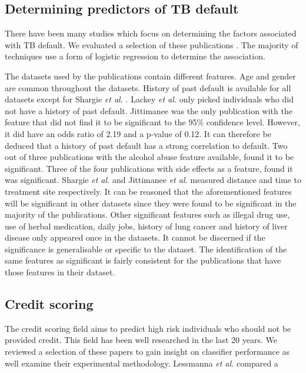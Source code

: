 \documentclass{sig-alternate-05-2015}
\begin{document}
	\subsection{Determining predictors of TB default}
	\label{predictors_of_defaulters_related_work}
	There have been many studies which focus on determining the factors associated with TB default. We evaluated a selection of these publications \cite{chan:2003prevalence, Jha:10.1371/journal.pone.0008873, jittimanee:10.1111/j.1440-172X.2007.00650.x, Lackey:10356751520150601, muture:6660173120110101, Shargie:10.1371/journal.pmed.0040037}. The majority of techniques use a form of logistic regression to determine the association. 
	
	The datasets used by the publications contain different features. Age and gender are common throughout the datasets. History of past default is available for all datasets except for Shargie \textit{et al.} \cite{Shargie:10.1371/journal.pmed.0040037}. Lackey \textit{et al.} \cite{Lackey:10356751520150601} only picked individuals who did not have a history of past default. Jittimanee \cite{jittimanee:10.1111/j.1440-172X.2007.00650.x} was the only publication with the feature that did not find it to be significant to the 95\% confidence level. However, it did have an odds ratio of 2.19 and a p-value of 0.12. It can therefore be deduced that a history of past default has a strong correlation to default. Two out of three publications with the alcohol abuse feature available, found it to be significant. Three of the four publications with side effects as a feature, found it was significant. Shargie \textit{et al.} \cite{Shargie:10.1371/journal.pmed.0040037} and Jittimanee \textit{et al.} \cite{jittimanee:10.1111/j.1440-172X.2007.00650.x} measured distance and time to treatment site respectively. It can be reasoned that the aforementioned features will be significant in other datasets since they were found to be significant in the majority of the publications. Other significant features such as illegal drug use, use of herbal medication, daily jobs, history of lung cancer and history of liver disease only appeared once in the datasets. It cannot be discerned if the significance is generalisable or specific to the dataset. The identification of the same features as significant is fairly consistent for the publications that have those features in their dataset. 

	\subsection{Credit scoring}
	The credit scoring field aims to predict high risk individuals who should not be provided credit. This field has been well researched in the last 20 years. We reviewed a selection of these papers to gain insight on classifier performance as well examine their experimental methodology. Lessmanna \textit{et al.} \cite{lessmanna2013benchmarking} compared a 
	
\end{document}
